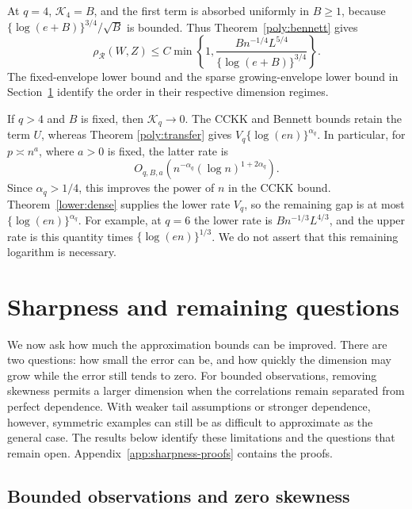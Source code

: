 \documentclass[11pt,letterpaper]{article}
\theoremstyle{remark}
\newcommand{\rh}{\rho_{\mathcal R}}
\begin{document}
At \(q=4\), \(\mathcal K_4=B\), and the first term is absorbed uniformly in
\(B\ge1\), because \(\{\log(e+B)\}^{3/4}/\sqrt B\) is bounded.
Thus Theorem~\ref{poly:bennett} gives
\begin{equation}
 \rh(W,Z)\le C\min\left\{1,
 \frac{Bn^{-1/4}L^{5/4}}{\{\log(e+B)\}^{3/4}}\right\}.
 \label{poly:q4}
\end{equation}
The fixed-envelope lower bound and the sparse growing-envelope lower
bound in Section~\ref{opt:section} identify the order in their respective
dimension regimes.

If \(q>4\) and \(B\) is fixed, then \(\mathcal K_q\to0\). The CCKK and
Bennett bounds retain the term \(U\), whereas Theorem
\ref{poly:transfer} gives \(V_q\{\log(en)\}^{\alpha_q}\). In particular, for
\(p\asymp n^a\), where \(a>0\) is fixed, the latter rate is
\[
 O_{q,B,a}\!\left(n^{-\alpha_q}(\log n)^{1+2\alpha_q}\right).
\]
Since \(\alpha_q>1/4\), this improves the power of \(n\) in the CCKK
bound. Theorem~\ref{lower:dense} supplies the lower rate \(V_q\), so
the remaining gap is at most \(\{\log(en)\}^{\alpha_q}\). For example, at
\(q=6\) the lower rate is \(Bn^{-1/3}L^{4/3}\), and the upper rate
is this quantity times \(\{\log(en)\}^{1/3}\). We do not assert that this
remaining logarithm is necessary.

\section{Sharpness and remaining questions}\label{opt:section}
We now ask how much the approximation bounds can be improved.
There are two questions: how small the error can be, and how quickly
the dimension may grow while the error still tends to zero.
For bounded observations, removing skewness permits a larger dimension
when the correlations remain separated from perfect dependence.
With weaker tail assumptions or stronger dependence, however, symmetric
examples can still be as difficult to approximate as the general case.
The results below identify these limitations and the questions that
remain open. Appendix~\ref{app:sharpness-proofs} contains the proofs.

\subsection{Bounded observations and zero skewness}
\end{document}
